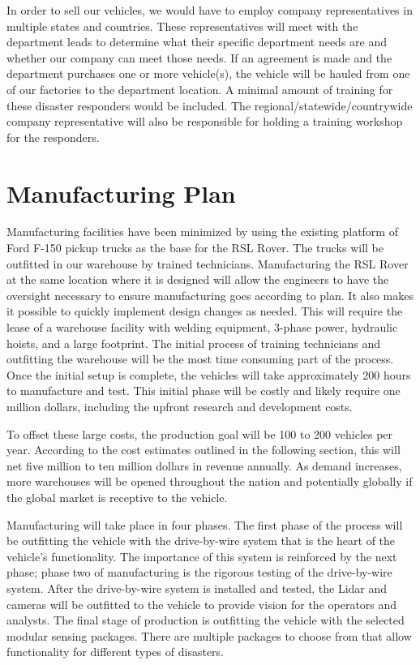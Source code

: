 In order to sell our vehicles, we would have to employ company representatives in multiple states and countries. These representatives will meet with the department leads to determine what their specific department needs are and whether our company can meet those needs. If an agreement is made and the department purchases one or more vehicle(s), the vehicle will be hauled from one of our factories to the department location. A minimal amount of training for these disaster responders would be included. The regional/statewide/countrywide company representative will also be responsible for holding a training workshop for the responders. 

\section{Manufacturing Plan}

Manufacturing facilities have been minimized by using the existing platform of Ford F-150 pickup trucks as the base for the RSL Rover. The trucks will be outfitted in our warehouse by trained technicians. Manufacturing the RSL Rover at the same location where it is designed will allow the engineers to have the oversight necessary to ensure manufacturing goes according to plan. It also makes it possible to quickly implement design changes as needed. This will require the lease of a warehouse facility with welding equipment, 3-phase power, hydraulic hoists, and a large footprint. The initial process of training technicians and outfitting the warehouse will be the most time consuming part of the process. Once the initial setup is complete, the vehicles will take approximately 200 hours to manufacture and test. This initial phase will be costly and likely require one million dollars, including the upfront research and development costs.

To offset these large costs, the production goal will be 100 to 200 vehicles per year. According to the cost estimates outlined in the following section, this will net five million to ten million dollars in revenue annually. As demand increases, more warehouses will be opened throughout the nation and potentially globally if the global market is receptive to the vehicle.

Manufacturing will take place in four phases. The first phase of the process will be outfitting the vehicle with the drive-by-wire system that is the heart of the vehicle's functionality. The importance of this system is reinforced by the next phase; phase two of manufacturing is the rigorous testing of the drive-by-wire system. After the drive-by-wire system is installed and tested, the Lidar and cameras will be outfitted to the vehicle to provide vision for the operators and analysts. The final stage of production is outfitting the vehicle with the selected modular sensing packages. There are multiple packages to choose from that allow functionality for different types of disasters.

